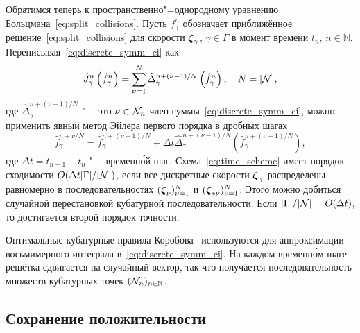 Обратимся теперь к пространственно"=однородному уравнению Больцмана~\eqref{eq:split_collisions}.
Пусть \(f_\gamma^n\) обозначает приближённое решение~\eqref{eq:split_collisions}
для скорости \({\boldsymbol{\zeta}}_\gamma\), \(\gamma\in\Gamma\) в момент времени \(t_n\), \(n\in\mathbb{N}\).
Переписывая~\eqref{eq:discrete_symm_ci} как
\begin{equation}\label{eq:discrete_short_ci}
    \hat{J}_\gamma^n\left(\hat{f}_\gamma^n\right) =
        \sum_{\nu=1}^N \hat{\Delta}_\gamma^{n+(\nu-1)/N} \left(\hat{f}_\gamma^n\right), \quad
    N=|\mathcal{N}|,
\end{equation}
где \(\hat{\Delta}_\gamma^{n+(\nu-1)/N}\) "--- это \(\nu\in\mathcal{N}_n\) член суммы~\eqref{eq:discrete_symm_ci},
можно применить явный метод Эйлера первого порядка в дробных шагах
\begin{equation}\label{eq:time_scheme}
    \hat{f}_\gamma^{n+\nu/N} = \hat{f}_\gamma^{n+(\nu-1)/N} + \Delta{t} \hat{\Delta}_\gamma^{n+(\nu-1)/N}
    \left(\hat{f}_\gamma^{n+(\nu-1)/N}\right),
\end{equation}
где \(\Delta{t} = t_{n+1} - t_n\) "--- временн\'{о}й шаг.
Схема~\eqref{eq:time_scheme} имеет порядок сходимости \(O(\Delta{t}|\Gamma|/|\mathcal{N}|)\),
если все дискретные скорости \({\boldsymbol{\zeta}}_\gamma\) распределены равномерно
в последовательностях \(({\boldsymbol{\zeta}}_{\nu})_{\nu=1}^N\) и \(({\boldsymbol{\zeta}}_{*\nu})_{\nu=1}^N\).
Этого можно добиться случайной перестановкой кубатурной последовательности.
Если \(|\Gamma|/|\mathcal{N}| = O(\Delta{t})\), то достигается второй порядок точности.

Оптимальные кубатурные правила Коробова~\cite{Korobov1959, Sloan1994} используются
для аппроксимации восьмимерного интеграла в~\eqref{eq:discrete_symm_ci}.
На каждом временн\'{о}м шаге решётка сдвигается на случайный вектор,
так что получается последовательность множеств кубатурных точек \((\mathcal{N}_n)_{n\in\mathbb{N}}\).

\subsection{Сохранение положительности}

